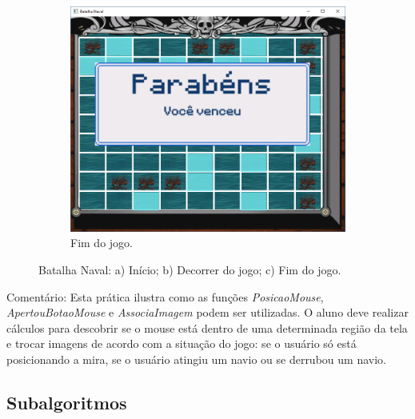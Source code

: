 \begin{renumerate}
\begin{figure}[H]
\begin{subfigure}[t]{0.3\textwidth}
        \centerline{\includegraphics[width=.9\textwidth]{img/cap2_ex29c.png}}
        \caption{Fim do jogo.}
        \label{fig:cap03_ex26c}
    \end{subfigure}
    \caption{Batalha Naval: a) Início; b) Decorrer do jogo; c) Fim do jogo.}
  \end{figure}

Comentário: Esta prática ilustra como as funções \emph{PosicaoMouse}, \emph{ApertouBotaoMouse} e \emph{AssociaImagem} podem ser utilizadas. O aluno deve realizar cálculos para descobrir se o mouse está dentro de uma determinada região da tela e trocar imagens de acordo com a situação do jogo: se o usuário só está posicionando a mira, se o usuário atingiu um navio ou se derrubou um navio.

%

\end{renumerate}

\subsection{Subalgoritmos}

